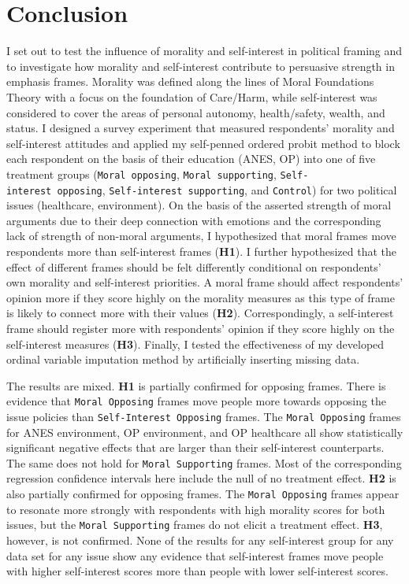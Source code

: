 \documentclass[12pt,econ]{sources/authesis}
\begin{document}
\hypertarget{framing-conclusion}{%
\section{Conclusion}\label{framing-conclusion}}

I set out to test the influence of morality and self-interest in political framing and to investigate how morality and self-interest contribute to persuasive strength in emphasis frames. Morality was defined along the lines of Moral Foundations Theory with a focus on the foundation of Care/Harm, while self-interest was considered to cover the areas of personal autonomy, health/safety, wealth, and status. I designed a survey experiment that measured respondents' morality and self-interest attitudes and applied my self-penned ordered probit method to block each respondent on the basis of their education (ANES, OP) into one of five treatment groups (\texttt{Moral\ opposing}, \texttt{Moral\ supporting}, \texttt{Self-interest\ opposing}, \texttt{Self-interest\ supporting}, and \texttt{Control}) for two political issues (healthcare, environment). On the basis of the asserted strength of moral arguments due to their deep connection with emotions and the corresponding lack of strength of non-moral arguments, I hypothesized that moral frames move respondents more than self-interest frames (\textbf{H1}). I further hypothesized that the effect of different frames should be felt differently conditional on respondents' own morality and self-interest priorities. A moral frame should affect respondents' opinion more if they score highly on the morality measures as this type of frame is likely to connect more with their values (\textbf{H2}). Correspondingly, a self-interest frame should register more with respondents' opinion if they score highly on the self-interest measures (\textbf{H3}). Finally, I tested the effectiveness of my developed ordinal variable imputation method by artificially inserting missing data.

The results are mixed. \textbf{H1} is partially confirmed for opposing frames. There is evidence that \texttt{Moral\ Opposing} frames move people more towards opposing the issue policies than \texttt{Self-Interest\ Opposing} frames. The \texttt{Moral\ Opposing} frames for ANES environment, OP environment, and OP healthcare all show statistically significant negative effects that are larger than their self-interest counterparts. The same does not hold for \texttt{Moral\ Supporting} frames. Most of the corresponding regression confidence intervals here include the null of no treatment effect. \textbf{H2} is also partially confirmed for opposing frames. The \texttt{Moral\ Opposing} frames appear to resonate more strongly with respondents with high morality scores for both issues, but the \texttt{Moral\ Supporting} frames do not elicit a treatment effect. \textbf{H3}, however, is not confirmed. None of the results for any self-interest group for any data set for any issue show any evidence that self-interest frames move people with higher self-interest scores more than people with lower self-interest scores.
\end{document}
